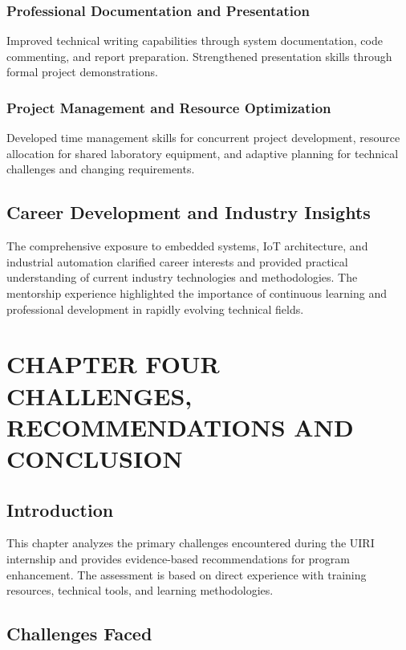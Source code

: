 \documentclass[12pt,a4paper]{report}
\begin{document}
\subsection{Professional Documentation and Presentation}
\noindent Improved technical writing capabilities through system documentation, code commenting, and report preparation. Strengthened presentation skills through formal project demonstrations.

\subsection{Project Management and Resource Optimization}
\noindent Developed time management skills for concurrent project development, resource allocation for shared laboratory equipment, and adaptive planning for technical challenges and changing requirements.

\section{Career Development and Industry Insights}

\noindent The comprehensive exposure to embedded systems, IoT architecture, and industrial automation clarified career interests and provided practical understanding of current industry technologies and methodologies. The mentorship experience highlighted the importance of continuous learning and professional development in rapidly evolving technical fields.

\newpage
\chapter[CHAPTER FOUR CHALLENGES, RECOMMENDATIONS AND CONCLUSION]{CHAPTER FOUR \\CHALLENGES, RECOMMENDATIONS AND CONCLUSION}
\vspace{-0.4cm}
\section{Introduction}
\vspace{-0.2cm}
\noindent This chapter analyzes the primary challenges encountered during the UIRI internship and provides evidence-based recommendations for program enhancement. The assessment is based on direct experience with training resources, technical tools, and learning methodologies.

\section{Challenges Faced}
\end{document}
